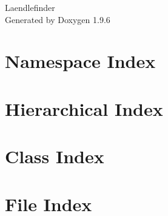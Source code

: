 \documentclass[twoside]{book}
\newcommand{\+}{\discretionary{\mbox{\scriptsize$\hookleftarrow$}}{}{}}
\newcommand{\clearemptydoublepage}{%
    \newpage{\pagestyle{empty}\cleardoublepage}%
  }
\begin{document}
  \raggedbottom
    \hypersetup{pageanchor=false,
                bookmarksnumbered=true,
                pdfencoding=unicode
               }
  \begin{titlepage}
  \vspace*{7cm}
  \begin{center}%
  {\Large Laendlefinder}\\
  \vspace*{1cm}
  {\large Generated by Doxygen 1.9.6}\\
  \end{center}
  \end{titlepage}
  \clearemptydoublepage
  \tableofcontents
  \clearemptydoublepage
  \hypersetup{pageanchor=true}
\chapter{Namespace Index}

\chapter{Hierarchical Index}

\chapter{Class Index}

\chapter{File Index}

\end{document}
